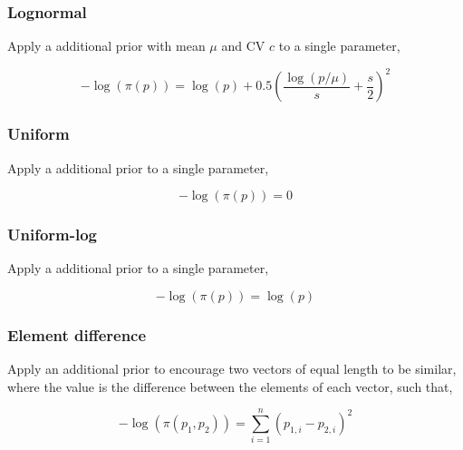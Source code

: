 \subsubsection{Lognormal}\label{sec:AdditionalPrior-LogNormal}

Apply a  additional prior with mean $\mu$ and CV $c$ to a single parameter,

\begin{equation}
- \log \left(\pi \left(p \right) \right) = \log \left( p \right) + 0.5 \left( \frac{\log \left( p / \mu \right)}{s} + \frac{s}{2} \right)^2
\end{equation}

\subsubsection{Uniform}\label{sec:AdditionalPrior-UniformLog}
	
Apply a  additional prior to a single parameter,
	
\begin{equation}
- \log \left(\pi \left(p \right) \right) = 0
\end{equation}

\subsubsection{Uniform-log}\label{sec:AdditionalPrior-Uniform}

Apply a  additional prior to a single parameter,

\begin{equation}
	- \log \left(\pi \left(p \right) \right) = \log \left( p \right)
\end{equation}

\subsubsection{Element difference}\label{sec:AdditionalPrior-ElementDifference}

Apply an  additional prior to encourage two vectors of equal length to be similar, where the value is the difference between the elements of each vector, such that,

\begin{equation}
- \log \left(\pi \left(p_1,p_2 \right) \right) = \sum_{i = 1}^n \left( p_{1,i} - p_{2,i} \right)^2
\end{equation}

